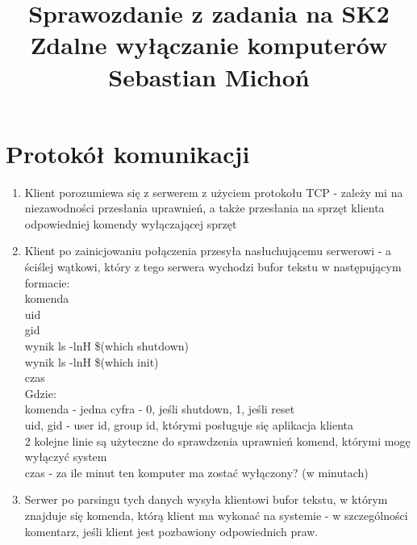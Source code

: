 \documentclass[12pt]{article}
\begin{document}
\title{Sprawozdanie z zadania na SK2\\
\large Zdalne wyłączanie komputerów\\
\large Sebastian Michoń}
\date{\vspace{-10ex}}
\maketitle


\section{Protokół komunikacji}
\begin {enumerate}
	\item Klient porozumiewa się z serwerem z użyciem protokołu TCP - zależy mi na niezawodności przesłania uprawnień, 
	a także przesłania na sprzęt klienta odpowiedniej komendy wyłączającej sprzęt
	\item Klient po zainicjowaniu połączenia przesyła nasłuchującemu serwerowi - a ściślej wątkowi, który z tego serwera wychodzi bufor tekstu w następującym formacie:\\
	komenda\\
	uid\\
	gid\\
	wynik ls -lnH \$(which shutdown)\\
	wynik ls -lnH \$(which init)\\
	czas\\
	Gdzie:\\
	komenda - jedna cyfra - 0, jeśli shutdown, 1, jeśli reset\\
	uid, gid - user id, group id, którymi posługuje się aplikacja klienta\\
	2 kolejne linie są użyteczne do sprawdzenia uprawnień komend, którymi mogę wyłączyć system\\
	czas - za ile minut ten komputer ma zostać wyłączony? (w minutach)
	\item Serwer po parsingu tych danych wysyła klientowi bufor tekstu, w którym znajduje się komenda, którą klient ma wykonać na systemie - w szczególności komentarz, jeśli klient jest pozbawiony odpowiednich praw.
\end {enumerate}
\end{document}
